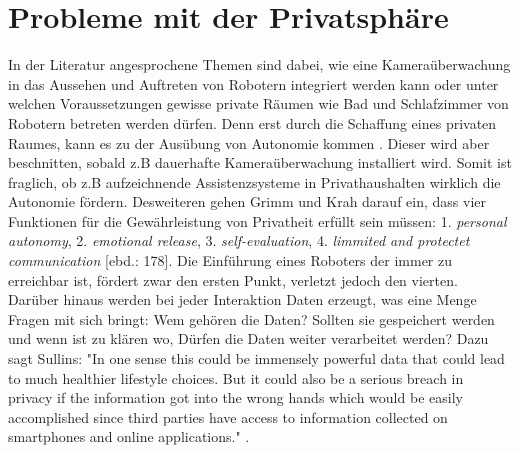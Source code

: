 \section{Probleme mit der Privatsphäre}
\label{sec:priv}
In der Literatur angesprochene Themen sind dabei, wie eine Kameraüberwachung in das Aussehen und Auftreten von Robotern integriert werden kann oder unter welchen Voraussetzungen gewisse private Räumen wie Bad und Schlafzimmer von Robotern betreten werden dürfen. Denn erst durch die Schaffung eines privaten Raumes, kann es zu der Ausübung von Autonomie kommen \cite[178]{priv}. Dieser wird aber beschnitten, sobald z.B dauerhafte Kameraüberwachung installiert wird. Somit ist fraglich, ob z.B aufzeichnende Assistenzsysteme in Privathaushalten wirklich die Autonomie fördern. Desweiteren gehen Grimm und Krah darauf ein, dass vier Funktionen für die Gewährleistung von Privatheit erfüllt sein müssen: 1. \textit{personal autonomy}, 2. \textit{emotional release}, 3. \textit{self-evaluation}, 4. \textit{limmited and protectet communication} [ebd.: 178]. Die Einführung eines Roboters der immer zu erreichbar ist, fördert zwar den ersten Punkt, verletzt jedoch den vierten.
Darüber hinaus werden bei jeder Interaktion Daten erzeugt, was eine Menge Fragen mit sich bringt: Wem gehören die Daten? Sollten sie gespeichert werden und wenn ist zu klären wo, Dürfen die Daten weiter verarbeitet werden? Dazu sagt Sullins: "In one sense this could be immensely powerful data that could lead to much healthier lifestyle choices. But it could also be a serious breach in privacy if the information got into the wrong hands which would be easily accomplished since third parties have access to information collected on smartphones and online applications." \cite{sullins}. 

